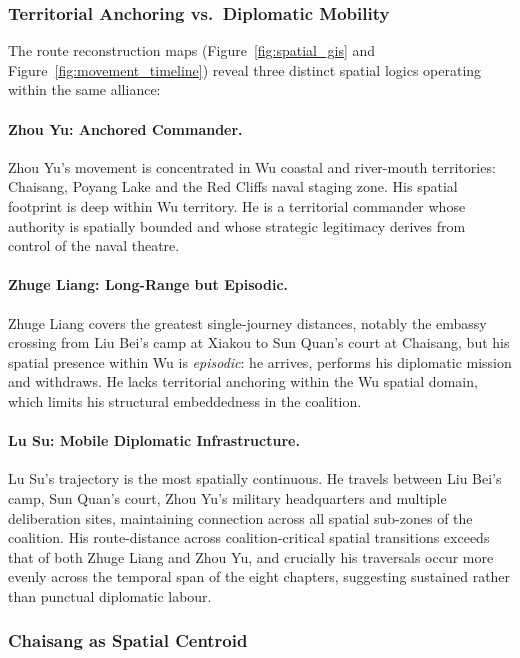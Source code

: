 \documentclass[12pt, a4paper]{article}
\newcommand{\figref}[1]{Figure~\ref{#1}}
\begin{document}
\subsubsection{Territorial Anchoring vs.\ Diplomatic Mobility}

The route reconstruction maps (\figref{fig:spatial_gis} and
\figref{fig:movement_timeline}) reveal three distinct spatial logics
operating within the same alliance:

\paragraph{Zhou Yu: Anchored Commander.}
Zhou Yu's movement is concentrated in Wu coastal and river-mouth territories:
Chaisang, Poyang Lake and the Red Cliffs naval staging zone.
His spatial footprint is deep within Wu territory.
He is a territorial commander whose authority is spatially bounded and
whose strategic legitimacy derives from control of the naval theatre.

\paragraph{Zhuge Liang: Long-Range but Episodic.}
Zhuge Liang covers the greatest single-journey distances, notably the
embassy crossing from Liu Bei's camp at Xiakou to Sun Quan's court at
Chaisang, but his spatial presence within Wu is \emph{episodic}:
he arrives, performs his diplomatic mission and withdraws.
He lacks territorial anchoring within the Wu spatial domain, which
limits his structural embeddedness in the coalition.

\paragraph{Lu Su: Mobile Diplomatic Infrastructure.}
Lu Su's trajectory is the most spatially continuous.
He travels between Liu Bei's camp, Sun Quan's court, Zhou Yu's military
headquarters and multiple deliberation sites, maintaining connection
across all spatial sub-zones of the coalition.
His route-distance across coalition-critical spatial transitions exceeds
that of both Zhuge Liang and Zhou Yu, and crucially his traversals
occur more evenly across the temporal span of the eight chapters,
suggesting sustained rather than punctual diplomatic labour.

\subsubsection{Chaisang as Spatial Centroid}
\end{document}
